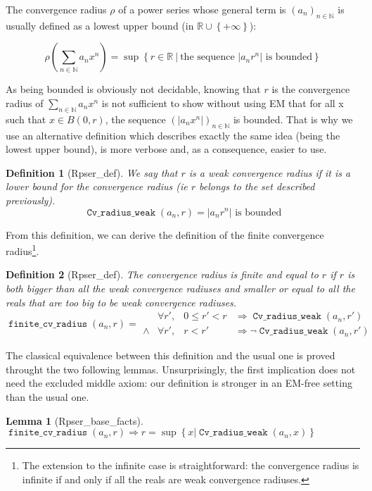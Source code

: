 \documentclass[submission,copyright]{eptcs}
\newcommand{\N}{\mathbb{N}}
\newcommand{\R}{\mathbb{R}}
\DeclareMathOperator{\cvrw}{\mathtt{Cv\_radius\_weak}}
\DeclareMathOperator{\fcvr}{\mathtt{finite\_cv\_radius}}
\newtheorem{definition}{Definition}
\newtheorem{lemma}{Lemma}
\begin{document}
The convergence radius $\rho$ of a power series whose general term is
$(a_n)_{n \in \N}$ is usually defined as a lowest upper bound (in
$\R \cup \left\lbrace +\infty \right\rbrace$):

 $$\rho(\sum_{n \in \N} a_n x^n) = \sup \left\lbrace r \in \R ~|~
   \text{the sequence } \left|a_n r^n\right| \text{ is bounded}
   \right\rbrace$$

As being bounded is obviously not decidable, knowing that $r$ is the
convergence radius of $\sum_{n \in \N} a_n x^n$ is not sufficient to
show without using EM that for all x such that $x \in B(0,r)$, the
sequence $(\left| a_n x^n \right|)_{n \in \N}$ is bounded. That is why
we use an alternative definition which describes exactly the same
idea (being the lowest upper bound), is more verbose and, as a
consequence, easier to use.

\begin{definition}[Rpser\_def] We say that $r$ is a weak convergence
radius if it is a lower bound for the convergence radius (ie $r$ belongs
to the set described previously).
$$\cvrw{}(a_n,r) = \left| a_n r^n \right| \text{ is bounded}$$
\end{definition}

From this definition, we can derive the definition of the finite
convergence radius\footnote{The extension to the infinite case is
straightforward: the convergence radius is infinite if and only if
all the reals are weak convergence radiuses.}.

\begin{definition}[Rpser\_def] The convergence radius is finite and
equal to $r$ if $r$ is both bigger than all the weak convergence radiuses 
and smaller or equal to all the reals that are too big to be weak
convergence radiuses.
$$\fcvr{}(a_n,r) =
\begin{array}{clcl}
        & \forall r', & 0 \le r' < r & \Rightarrow \cvrw{}(a_n,r') \\
 \wedge & \forall r', & r < r' & \Rightarrow \neg \cvrw{}(a_n,r')
\end{array}$$
\end{definition}

The classical equivalence between this definition and the usual one is proved
throught the two following lemmas. Unsurprisingly, the first implication does
not need the excluded middle axiom: our definition is stronger in an EM-free
setting than the usual one.

\begin{lemma}[Rpser\_base\_facts] $\fcvr{}(a_n,r) \Rightarrow r = \sup \left\lbrace x |
\cvrw{}(a_n, x) \right\rbrace$ \end{lemma}
\end{document}
